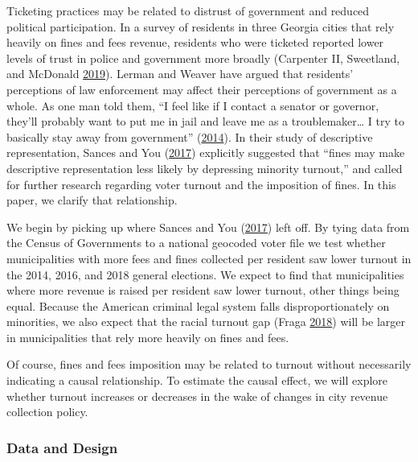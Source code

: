 \documentclass[
  12pt,
]{article}
\begin{document}
Ticketing practices may be related to distrust of government and reduced political participation. In a survey of residents in three Georgia cities that rely heavily on fines and fees revenue, residents who were ticketed reported lower levels of trust in police and government more broadly (Carpenter II, Sweetland, and McDonald \protect\hyperlink{ref-CarpenterII2019}{2019}). Lerman and Weaver have argued that residents' perceptions of law enforcement may affect their perceptions of government as a whole. As one man told them, ``I feel like if I contact a senator or governor, they'll probably want to put me in jail and leave me as a troublemaker\ldots{} I try to basically stay away from government'' (\protect\hyperlink{ref-Lerman2014}{2014}). In their study of descriptive representation, Sances and You (\protect\hyperlink{ref-Sances2017}{2017}) explicitly suggested that ``fines may make descriptive representation less likely by depressing minority turnout,'' and called for further research regarding voter turnout and the imposition of fines. In this paper, we clarify that relationship.

We begin by picking up where Sances and You (\protect\hyperlink{ref-Sances2017}{2017}) left off. By tying data from the Census of Governments to a national geocoded voter file we test whether municipalities with more fees and fines collected per resident saw lower turnout in the 2014, 2016, and 2018 general elections. We expect to find that municipalities where more revenue is raised per resident saw lower turnout, other things being equal. Because the American criminal legal system falls disproportionately on minorities, we also expect that the racial turnout gap (Fraga \protect\hyperlink{ref-Fraga2018}{2018}) will be larger in municipalities that rely more heavily on fines and fees.

Of course, fines and fees imposition may be related to turnout without necessarily indicating a causal relationship. To estimate the causal effect, we will explore whether turnout increases or decreases in the wake of changes in city revenue collection policy.

\hypertarget{data-and-design}{%
\subsubsection*{Data and Design}\label{data-and-design}}
\end{document}
